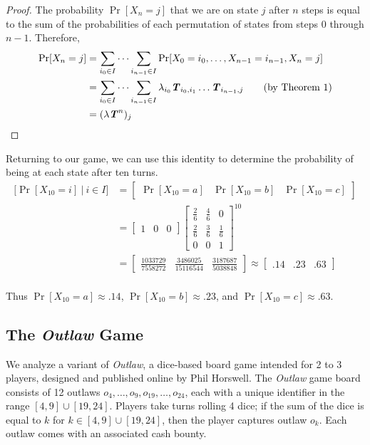 \documentclass{article}
\newcommand{\T}{\textbf{\textit{T}}}
\theoremstyle{definition}
\theoremstyle{plain}
\begin{document}
	\begin{proof}
	The probability $\Pr[X_n = j]$ that we are on state $j$ after $n$ steps is equal to the sum of the probabilities of each permutation of states from steps $0$ through $n-1$. Therefore,
	\begin{align*}
	\Pr[X_n = j] &= \sum_{i_0 \in I} \dots \sum_{i_{n-1} \in I} \Pr[X_0 = i_0, \dots, X_{n-1} = i_{n-1}, X_n = j]\\
	&= \sum_{i_0 \in I} \dots \sum_{i_{n-1} \in I} \lambda_{i_0}\T_{i_0, i_1}\dots\T_{i_{n-1}, j} \tag{by Theorem 1}\\
	&= (\lambda \T^n)_j
	\end{align*}
	\end{proof}
	
		Returning to our game, we can use this identity to determine the probability of being at each state after ten turns.
		\begin{align*}
		\Big[\Pr[X_{10} = i] ~|~ i \in I\Big] &= 
		\begin{bmatrix}
		\Pr[X_{10} = a] & \Pr[X_{10} = b] & \Pr[X_{10} = c]
		\end{bmatrix}\\ &=
		\begin{bmatrix}
		1 & 0 & 0
		\end{bmatrix}
		\begin{bmatrix}
			\frac{2}{6} & \frac{4}{6} & 0           \\
			\frac{2}{6} & \frac{3}{6} & \frac{1}{6} \\
			0           & 0			  & 1
		\end{bmatrix}
		^{10}\\
		&=	
		\begin{bmatrix}
		\frac{1033729}{7558272} & \frac{3486025}{15116544} & \frac{3187687}{5038848}
		\end{bmatrix}
		\approx \begin{bmatrix}
		.14 & .23 & .63
		\end{bmatrix}
		\end{align*}
	\\
	Thus $\Pr[X_{10} = a] \approx .14$, $\Pr[X_{10} = b] \approx .23$, and $\Pr[X_{10} = c] \approx .63$.
	
	\subsection{The \textit{Outlaw} Game}
	We analyze a variant of \textit{Outlaw}, a dice-based board game intended for 2 to 3 players, designed and published online by Phil Horswell. The \textit{Outlaw} game board consists of 12 outlaws $o_4, \dots, o_{9}, o_{19}, \dots, o_{24}$, each with a unique identifier in the range $[4, 9] \cup [19, 24]$. Players take turns rolling 4 dice; if the sum of the dice is equal to $k$ for $k \in [4, 9] \cup [19, 24]$, then the player captures outlaw $o_k$. Each outlaw comes with an associated cash bounty.
	
\end{document}
